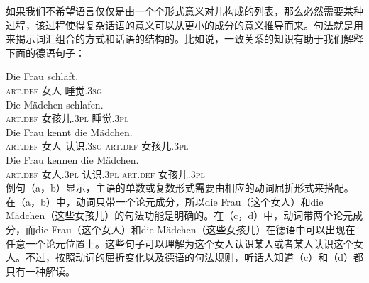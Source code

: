 如果我们不希望语言仅仅是由一个个形式意义对儿构成的列表，那么必然需要某种过程，该过程使得复杂话语的意义可以从更小的成分的意义推导而来。句法就是用来揭示词汇组合的方式和话语的结构的。比如说，一致关系的知识有助于我们解释下面的德语句子：

\eal
\label{Beispiel-mit-Kongruenz}
\ex 
\gll Die Frau schläft.\\
     \textsc{art}.\textsc{def} 女人 睡觉.\textsc{3sg}\\
\ex 
\gll Die Mädchen schlafen.\\
     \textsc{art}.\textsc{def} 女孩儿.\textsc{3pl} 睡觉.\textsc{3pl}\\
\ex 
\gll Die Frau kennt die Mädchen.\\
     \textsc{art}.\textsc{def} 女人 认识.\textsc{3sg} \textsc{art}.\textsc{def} 女孩儿.\textsc{3pl}\\
\ex 
\gll Die Frau kennen die Mädchen.\\
     \textsc{art}.\textsc{def} 女人.\textsc{3pl} 认识.\textsc{3pl} \textsc{art}.\textsc{def} 女孩儿.\textsc{3pl}\\
\zl
例句（a，b）显示，主语的单数或复数形式需要由相应的动词屈折形式来搭配。在（a，b）中，动词只带一个论元成分，所以die Frau（这个女人）和die Mädchen（这些女孩儿）的句法功能是明确的。在（c，d）中，动词带两个论元成分，而die Frau（这个女人）和die Mädchen（这些女孩儿）在德语中可以出现在任意一个论元位置上。这些句子可以理解为这个女人认识某人或者某人认识这个女人。不过，按照动词的屈折变化以及德语的句法规则，听话人知道（c）和（d）都只有一种解读。
 
